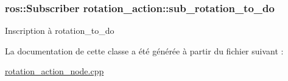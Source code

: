 \subsubsection[{\texorpdfstring{sub\+\_\+rotation\+\_\+to\+\_\+do}{sub_rotation_to_do}}]{\setlength{\rightskip}{0pt plus 5cm}ros\+::\+Subscriber rotation\+\_\+action\+::sub\+\_\+rotation\+\_\+to\+\_\+do\hspace{0.3cm}{\ttfamily [private]}}\hypertarget{classrotation__action_a859728fbc860bab7d39ea5b31751300f}{}\label{classrotation__action_a859728fbc860bab7d39ea5b31751300f}
Inscription à rotation\+\_\+to\+\_\+do 

La documentation de cette classe a été générée à partir du fichier suivant \+:\begin{DoxyCompactItemize}
\item 
\hyperlink{rotation__action__node_8cpp}{rotation\+\_\+action\+\_\+node.\+cpp}\end{DoxyCompactItemize}

